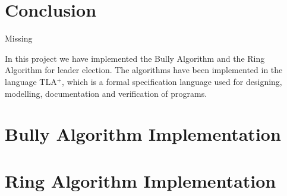 \documentclass{report}
\begin{document}
\chapter{Conclusion}

\begin{callout}
  Missing
  \end{callout}

In this project we have implemented the Bully Algorithm and the Ring Algorithm for leader election. The algorithms have been implemented in the language TLA$^{+}$, which is a formal specification language used for designing, modelling, documentation and verification of programs.




\appendix

\chapter{Bully Algorithm Implementation}



\chapter{Ring Algorithm Implementation}
\end{document}
